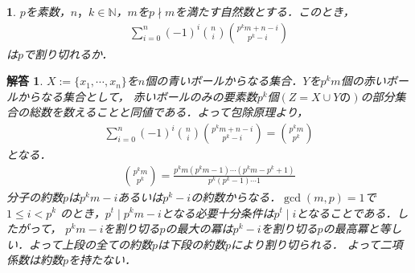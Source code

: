 \documentclass[dvipdfmx]{jsarticle}
\newtheorem*{answer*}{解答}
\newtheorem{prob}{}[]
\begin{document}
\begin{screen}
  \begin{prob}
    $p$を素数，$n，k\in \mathbb{N}$，$m$を$p\nmid m$を満たす自然数とする．このとき，
\begin{align*}
  \sum_{i=0}^{n}(-1)^i\binom{n}{i}\binom{p^km+n-i}{p^k-i}
\end{align*}
は$p$で割り切れるか．
  \end{prob}
\end{screen}
\begin{answer*}
  $X:=\{x_{1},\cdots,x_{n}\}$を$n$個の青いボールからなる集合．$Y$を$p^km$個の赤いボールからなる集合として，
  赤いボールのみの要素数$p^k$個$(Z=X\cup Yの)$の部分集合の総数を数えることと同値である．よって包除原理より，
  \begin{align*}
  \sum_{i=0}^{n}(-1)^i\binom{n}{i}\binom{p^km+n-i}{p^k-i}=\binom{p^km}{p^k} 
  \end{align*}
  となる．
  \begin{align*}
    \binom{p^km}{p^k}=\frac{p^km(p^km-1)\cdots(p^km-p^k+1)}{p^k(p^k-1)\cdots 1}
  \end{align*}
  分子の約数$p$は$p^km-i$あるいは$p^k-i$の約数からなる．$\gcd(m,p)=1$で$1\leq i<p^k$
  のとき，$p^t\mid p^km-i$となる必要十分条件は$p^t\mid i$となることである．したがって，
  $p^km-i$を割り切る$p$の最大の冪は$p^k-i$を割り切る$p$の最高冪と等しい．よって上段の全ての約数$p$は下段の約数$p$により割り切られる．
  よって二項係数は約数$p$を持たない．
\end{answer*}
\end{document}
